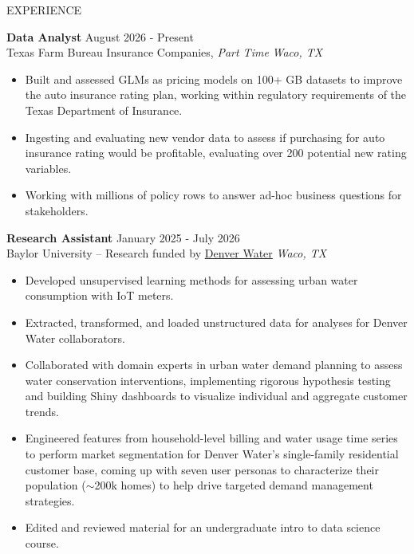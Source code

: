\documentclass{resume} %
\begin{document}


\begin{rSection}{EXPERIENCE}

\textbf{Data Analyst} \hfill August 2026 - Present\\
Texas Farm Bureau Insurance Companies, \textit{Part Time} \hfill \textit{Waco, TX}
 \begin{itemize}
    \itemsep -3pt {}
     \item Built and assessed GLMs as pricing models on 100+ GB datasets to improve the auto insurance rating plan, working within regulatory requirements of the Texas Department of Insurance.
     \item Ingesting and evaluating new vendor data to assess if purchasing for auto insurance rating would be profitable, evaluating over 200 potential new rating variables.
     \item Working with millions of policy rows to answer ad-hoc business questions for stakeholders.
 \end{itemize}

\textbf{Research Assistant} \hfill January 2025 - July 2026\\
Baylor University -- Research funded by \href{https://www.denverwater.org}{Denver Water} \hfill \textit{Waco, TX}
 \begin{itemize}
    \itemsep -3pt {}
     \item Developed unsupervised learning methods for assessing urban water consumption with IoT meters.
     \item Extracted, transformed, and loaded unstructured data for analyses for Denver Water collaborators.
     \item Collaborated with domain experts in urban water demand planning to assess water conservation interventions, implementing rigorous hypothesis testing and building Shiny dashboards to visualize individual and aggregate customer trends.
     \item Engineered features from household-level billing and water usage time series to perform market segmentation for Denver Water's single-family residential customer base, coming up with seven user personas to characterize their population ($\sim$200k homes) to help drive targeted demand management strategies.
     \item Edited and reviewed material for an undergraduate intro to data science course.
 \end{itemize}


\end{rSection}
\end{document}
